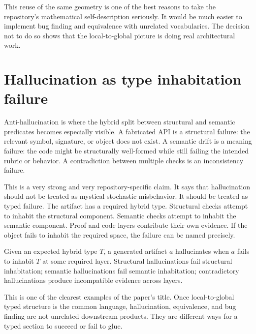 This reuse of the same geometry is one of the best reasons to take the repository's
mathematical self-description seriously. It would be much easier to implement bug finding
and equivalence with unrelated vocabularies. The decision not to do so shows that the
local-to-global picture is doing real architectural work.

\section*{Hallucination as type inhabitation failure}
Anti-hallucination is where the hybrid split between structural and semantic predicates
becomes especially visible. A fabricated API is a structural failure: the relevant symbol,
signature, or object does not exist. A semantic drift is a meaning failure: the code might
be structurally well-formed while still failing the intended rubric or behavior. A
contradiction between multiple checks is an inconsistency failure.

This is a very strong and very repository-specific claim. It says that hallucination should
not be treated as mystical stochastic misbehavior. It should be treated as typed failure.
The artifact has a required hybrid type. Structural checks attempt to inhabit the
structural component. Semantic checks attempt to inhabit the semantic component. Proof and
code layers contribute their own evidence. If the object fails to inhabit the required
space, the failure can be named precisely.

\begin{definition}
Given an expected hybrid type $T$, a generated artifact $a$ hallucinates when $a$ fails to
inhabit $T$ at some required layer. Structural hallucinations fail structural inhabitation;
semantic hallucinations fail semantic inhabitation; contradictory hallucinations produce
incompatible evidence across layers.
\end{definition}

This is one of the clearest examples of the paper's title. Once local-to-global typed
structure is the common language, hallucination, equivalence, and bug finding are not
unrelated downstream products. They are different ways for a typed section to succeed or
fail to glue.
